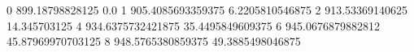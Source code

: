 0 899.18798828125 0.0
1 905.4085693359375 6.2205810546875
2 913.53369140625 14.345703125
4 934.6375732421875 35.4495849609375
6 945.0676879882812 45.87969970703125
8 948.5765380859375 49.3885498046875

